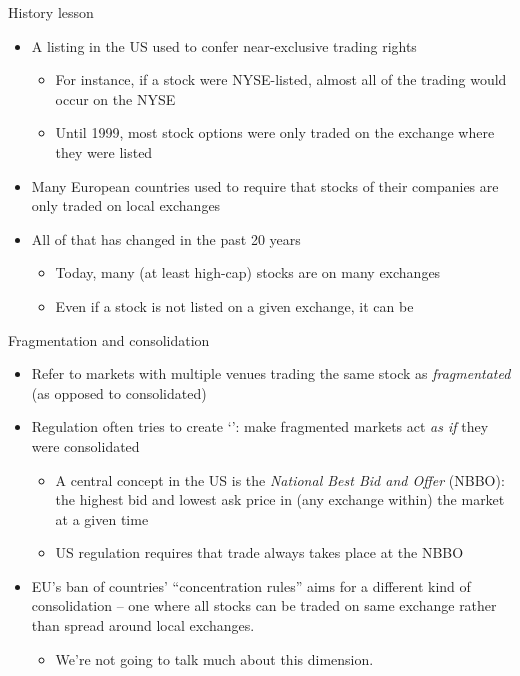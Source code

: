 \documentclass[english,10pt
,aspectratio=169
]{beamer}
\begin{document}
\begin{frame}{History lesson}
	\begin{itemize}
		\item A listing in the US used to confer near-exclusive trading rights
		\begin{itemize}
			\item For instance, if a stock were NYSE-listed, almost all of the trading would occur on the NYSE
			\item Until 1999, most stock options were only traded on the exchange where they were listed
		\end{itemize}
		\item Many European countries used to require that stocks of their companies are only traded on local exchanges
		\pause
		\item All of that has changed in the past 20 years
		\begin{itemize}
			\item Today, many (at least high-cap) stocks are  on many exchanges
			\item Even if a stock is not listed on a given exchange, it can be 
		\end{itemize}
	\end{itemize}
\end{frame}


\begin{frame}{Fragmentation and consolidation}
	\begin{itemize}
		\item Refer to markets with multiple venues trading the same stock as \textit{fragmentated} (as opposed to consolidated)
		\item Regulation often tries to create `': make fragmented markets act \textit{as if} they were consolidated
		\begin{itemize}
			\item A central concept in the US is the \textit{National Best Bid and Offer} (NBBO): the highest bid and lowest ask price in (any exchange within) the market at a given time
			\item US regulation requires that trade always takes place at the NBBO
		\end{itemize}
		\pause
		\item EU's \alert{ban} of countries' ``\alert{concentration rules}'' aims for a different kind of consolidation -- one where all stocks can be traded on same exchange rather than spread around local exchanges.
		\begin{itemize}
			\item We're not going to talk much about this dimension.
		\end{itemize}
	\end{itemize}
\end{frame}
\end{document}
